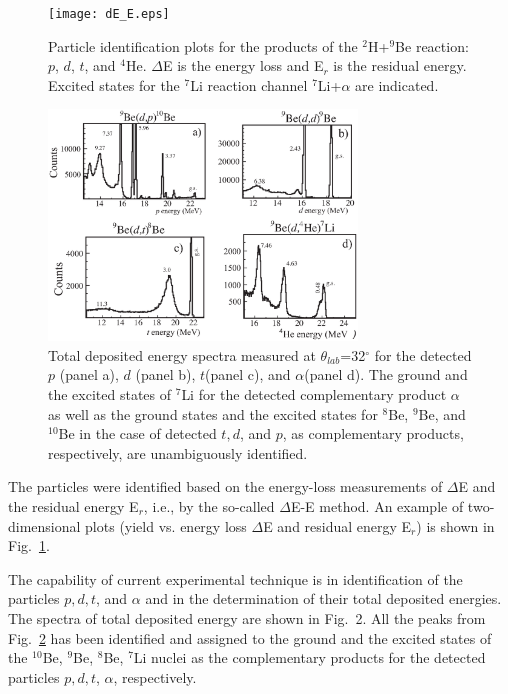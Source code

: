\documentclass[10pt]{iopart}
\begin{document}
\begin{figure}[tp]
\centering
\texttt{[image: dE\_E.eps]}
\caption{Particle identification plots for the products of the $^{2}$H+$^9$Be reaction: $p$, $d$, $t$, and $^{4}$He. $\Delta$E is the energy loss and E$_r$ is the residual energy. Excited states for the $^7$Li reaction channel $^7$Li+$\alpha$ are indicated.}
\label{fig1}
\end{figure}

\begin{figure}[tp]
 \includegraphics[width=8.2cm]{d_Etot_Fig2.eps}
\caption{Total deposited energy spectra measured at $\theta_{lab}$=32$^\circ$ for the detected $p$ (panel a), $d$ (panel b), $t$(panel c), and $\alpha$(panel d). The ground and the excited states of $^7$Li for the detected complementary product $\alpha$ as well as the ground states and the excited states for $^8$Be, $^9$Be, and $^{10}$Be in the case of detected $t, d$, and $p$, as complementary products, respectively, are unambiguously identified.}
\label{fig2}
\end{figure}	

 The particles were identified based on the energy-loss measurements of $\Delta$E and the residual energy E$_r$, i.e., by the so-called $\Delta$E-E method. 
	An example of two-dimensional plots (yield vs. energy loss $\Delta$E and residual energy E$_r$) is shown in Fig.~\ref{fig1}.

The capability of current experimental technique is in identification of the particles $p, d, t$, and $\alpha$ and in the determination of their total deposited energies. The spectra of total deposited energy are shown in Fig.~2. All the peaks from Fig.~\ref{fig2} has been identified and assigned to the ground and the excited states of the $^{10}$Be, $^9$Be, $^8$Be, $^7$Li nuclei as the complementary products for the detected particles $p, d, t$, $\alpha$, respectively.
\end{document}
